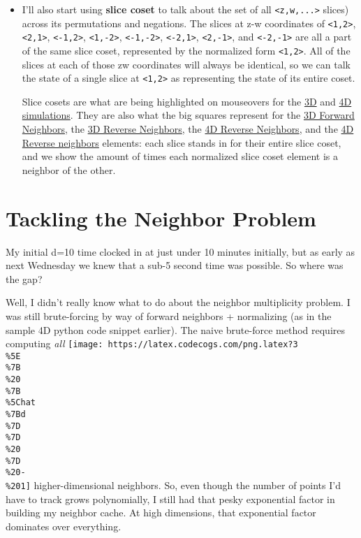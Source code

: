 \documentclass[]{article}
\begin{document}
\begin{itemize}
\item
  I'll also start using \textbf{slice coset} to talk about the set of all
  \texttt{\textless{}z,w,...\textgreater{}} slices) across its permutations and
  negations. The slices at z-w coordinates of
  \texttt{\textless{}1,2\textgreater{}}, \texttt{\textless{}2,1\textgreater{}},
  \texttt{\textless{}-1,2\textgreater{}},
  \texttt{\textless{}1,-2\textgreater{}},
  \texttt{\textless{}-1,-2\textgreater{}},
  \texttt{\textless{}-2,1\textgreater{}},
  \texttt{\textless{}2,-1\textgreater{}}, and
  \texttt{\textless{}-2,-1\textgreater{}} are all a part of the same slice
  coset, represented by the normalized form
  \texttt{\textless{}1,2\textgreater{}}. All of the slices at each of those zw
  coordinates will always be identical, so we can talk the state of a single
  slice at \texttt{\textless{}1,2\textgreater{}} as representing the state of
  its entire coset.

  Slice cosets are what are being highlighted on mouseovers for the
  \protect\hyperlink{gol3D}{3D} and \protect\hyperlink{gol4D}{4D simulations}.
  They are also what the big squares represent for the
  \protect\hyperlink{golSyms3DForward}{3D Forward Neighbors}, the
  \protect\hyperlink{golSyms3DReverse}{3D Reverse Neighbors}, the
  \protect\hyperlink{golSyms4DForward}{4D Reverse Neighbors}, and the
  \protect\hyperlink{golSyms4DReverse}{4D Reverse neighbors} elements: each
  slice stands in for their entire slice coset, and we show the amount of times
  each normalized slice coset element is a neighbor of the other.
\end{itemize}

\hypertarget{tackling-the-neighbor-problem}{%
\section{Tackling the Neighbor Problem}\label{tackling-the-neighbor-problem}}

My initial d=10 time clocked in at just under 10 minutes initially, but as early
as next Wednesday we knew that a sub-5 second time was possible. So where was
the gap?

Well, I didn't really know what to do about the neighbor multiplicity problem. I
was still brute-forcing by way of forward neighbors + normalizing (as in the
sample 4D python code snippet earlier). The naive brute-force method requires
computing \emph{all}
\texttt{[image: https://latex.codecogs.com/png.latex?3\\\%5E\\\%7B\\\%20\\\%7B\\\%5Chat\\\%7Bd\\\%7D\\\%7D\\\%20\\\%7D\\\%20-\\\%201]}
higher-dimensional neighbors. So, even though the number of points I'd have to
track grows polynomially, I still had that pesky exponential factor in building
my neighbor cache. At high dimensions, that exponential factor dominates over
everything.
\end{document}
